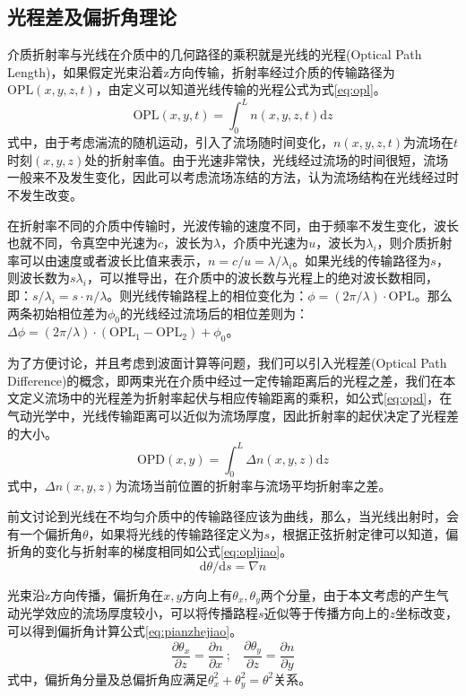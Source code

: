 \subsection{光程差及偏折角理论}
介质折射率与光线在介质中的几何路径的乘积就是光线的光程(Optical Path Length)，如果假定光束沿着z方向传输，折射率经过介质的传输路径为$\text{OPL}(x,y,z,t)$，由定义可以知道光线传输的光程公式为式\eqref{eq:opl}。
\begin{equation}
\text{OPL}(x,y,t)=\int_{0}^{L}n(x,y,z,t)\text{d}z
\label{eq:opl}
\end{equation}
式中，由于考虑湍流的随机运动，引入了流场随时间变化，$n(x,y,z,t)$为流场在$t$时刻$(x,y,z)$处的折射率值。由于光速非常快，光线经过流场的时间很短，流场一般来不及发生变化，因此可以考虑流场冻结的方法，认为流场结构在光线经过时不发生改变。

在折射率不同的介质中传输时，光波传输的速度不同，由于频率不发生变化，波长也就不同，令真空中光速为$c$，波长为$\lambda$，介质中光速为$u$，波长为$\lambda_i$，则介质折射率可以由速度或者波长比值来表示，$n=c/u=\lambda/\lambda_i$。如果光线的传输路径为$s$，则波长数为$s\lambda_i$，可以推导出，在介质中的波长数与光程上的绝对波长数相同，即：$s/\lambda_i=s\cdot n/\lambda$。则光线传输路程上的相位变化为：$\phi=(2\pi/\lambda)\cdot\text{OPL}$。那么两条初始相位差为$\phi_0$的光线经过流场后的相位差则为：$\Delta\phi=(2\pi/\lambda)\cdot(\text{OPL}_1-\text{OPL}_2)+\phi_0$。

为了方便讨论，并且考虑到波面计算等问题，我们可以引入光程差(Optical Path Difference)的概念，即两束光在介质中经过一定传输距离后的光程之差，我们在本文定义流场中的光程差为折射率起伏与相应传输距离的乘积，如公式\eqref{eq:opd}，在气动光学中，光线传输距离可以近似为流场厚度，因此折射率的起伏决定了光程差的大小。
\begin{equation}
\text{OPD}(x,y)=\int_{0}^{L}\Delta n(x,y,z)\text{d}z
\label{eq:opd}
\end{equation}
式中，$\Delta n(x,y,z)$为流场当前位置的折射率与流场平均折射率之差。

前文讨论到光线在不均匀介质中的传输路径应该为曲线，那么，当光线出射时，会有一个偏折角$\theta$，如果将光线的传输路径定义为$s$，根据正弦折射定律可以知道，偏折角的变化与折射率的梯度相同如公式\eqref{eq:opljiao}。
\begin{equation}
\text{d}\theta/\text{d}s=\nabla n
\label{eq:opljiao}
\end{equation}

光束沿z方向传播，偏折角在$x,y$方向上有$\theta_x,\theta_y$两个分量，由于本文考虑的产生气动光学效应的流场厚度较小，可以将传播路程$s$近似等于传播方向上的$z$坐标改变，可以得到偏折角计算公式\eqref{eq:pianzhejiao}。
\begin{equation}
\frac{\partial\theta_x}{\partial z}=\frac{\partial n}{\partial x}~;
~~~~\frac{\partial\theta_y}{\partial z}=\frac{\partial n}{\partial y}
\label{eq:pianzhejiao}
\end{equation}
式中，偏折角分量及总偏折角应满足$\theta_x^2+\theta_y^2=\theta^2$关系。

